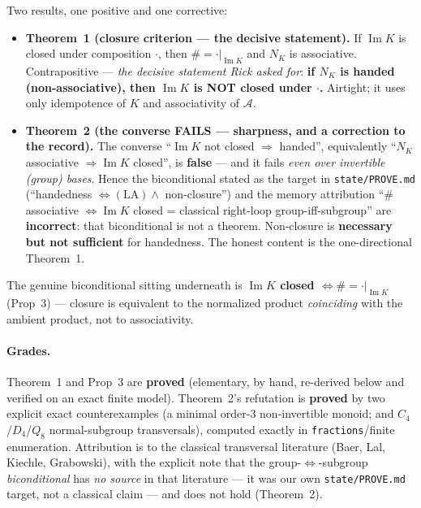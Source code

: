 \documentclass[11pt]{article}
\theoremstyle{plain}
\theoremstyle{definition}
\theoremstyle{remark}
\newcommand{\Acat}{\mathcal{A}}
\renewcommand{\Im}{\operatorname{Im}}
\newcommand{\NK}{N_K}
\begin{document}
Two results, one positive and one corrective:

\begin{itemize}[leftmargin=1.4em]
\item \textbf{Theorem~1 (closure criterion --- the decisive statement).} If $\Im K$ is closed
  under composition $\cdot$, then $\# = \cdot|_{\Im K}$ and $\NK$ is associative. Contrapositive
  --- \emph{the decisive statement Rick asked for}: \textbf{if $\NK$ is handed
  (non-associative), then $\Im K$ is NOT closed under $\cdot$.} Airtight; it uses only
  idempotence of $K$ and associativity of $\Acat$.

\item \textbf{Theorem~2 (the converse FAILS --- sharpness, and a correction to the record).} The
  converse ``$\Im K$ not closed $\Rightarrow$ handed'', equivalently ``$\NK$ associative
  $\Rightarrow \Im K$ closed'', is \textbf{false} --- and it fails \emph{even over invertible
  (group) bases}. Hence the biconditional stated as the target in \texttt{state/PROVE.md}
  (``handedness $\iff (\mathrm{LA}) \wedge$ non-closure'') and the memory attribution
  ``$\#$ associative $\iff \Im K$ closed = classical right-loop group-iff-subgroup'' are
  \textbf{incorrect}: that biconditional is not a theorem. Non-closure is \textbf{necessary but not
  sufficient} for handedness. The honest content is the one-directional Theorem~1.
\end{itemize}

The genuine biconditional sitting underneath is \textbf{$\Im K$ closed $\iff \# = \cdot|_{\Im K}$}
(Prop~3) --- closure is equivalent to the normalized product \emph{coinciding} with the ambient
product, not to associativity.

\paragraph{Grades.} Theorem~1 and Prop~3 are \textbf{proved} (elementary, by hand, re-derived below
and verified on an exact finite model). Theorem~2's refutation is \textbf{proved} by two explicit
exact counterexamples (a minimal order-3 non-invertible monoid; and $C_4$/$D_4$/$Q_8$
normal-subgroup transversals), computed exactly in \texttt{fractions}/finite enumeration.
Attribution is to the classical transversal literature (Baer, Lal, Kiechle, Grabowski), with the
explicit note that the group-$\iff$-subgroup \emph{biconditional} has \emph{no source} in that
literature --- it was our own \texttt{state/PROVE.md} target, not a classical claim --- and does not
hold (Theorem~2).
\end{document}
